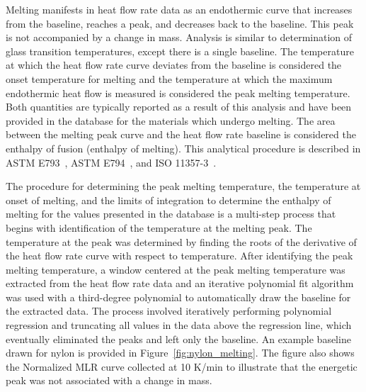 \documentclass[12pt,oneside]{book}
\begin{document}
Melting manifests in heat flow rate data as an endothermic curve that increases from the baseline, reaches a peak, and decreases back to the baseline. This peak is not accompanied by a change in mass. Analysis is similar to determination of glass transition temperatures, except there is a single baseline. The temperature at which the heat flow rate curve deviates from the baseline is considered the onset temperature for melting and the temperature at which the maximum endothermic heat flow is measured is considered the peak melting temperature. Both quantities are typically reported as a result of this analysis and have been provided in the database for the materials which undergo melting. The area between the melting peak curve and the heat flow rate baseline is considered the enthalpy of fusion (enthalpy of melting). This analytical procedure is described in ASTM E793~\cite{ASTM_E793}, ASTM E794~\cite{ASTM_E794}, and ISO 11357-3~\cite{ISO_11357-3}.

The procedure for determining the peak melting temperature, the temperature at onset of melting, and the limits of integration to determine the enthalpy of melting for the values presented in the database is a multi-step process that begins with identification of the temperature at the melting peak. The temperature at the peak was determined by finding the roots of the derivative of the heat flow rate curve with respect to temperature. After identifying the peak melting temperature, a  window centered at the peak melting temperature was extracted from the heat flow rate data and an iterative polynomial fit algorithm was used with a third-degree polynomial to automatically draw the baseline for the extracted data. The process involved iteratively performing polynomial regression and truncating all values in the data above the regression line, which eventually eliminated the peaks and left only the baseline. An example baseline drawn for nylon is provided in Figure~\ref{fig:nylon_melting}. The figure also shows the Normalized MLR curve collected at 10 K/min to illustrate that the energetic peak was not associated with a change in mass.
\end{document}
